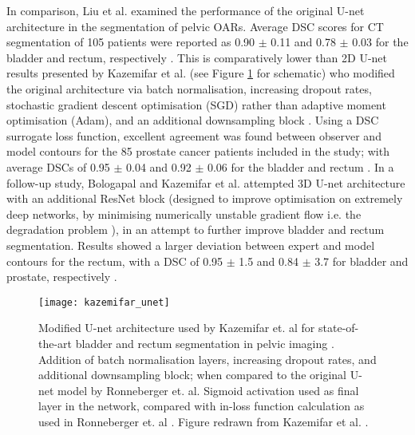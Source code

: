 In comparison, Liu et al. examined the performance of the original U-net architecture in the segmentation of pelvic OARs. Average DSC scores for CT segmentation of 105 patients were reported as 0.90 $\pm$ 0.11 and 0.78 $\pm$ 0.03 for the bladder and rectum, respectively \cite{Liu_2020}. This is comparatively lower than 2D U-net results presented by Kazemifar et al. (see Figure \ref{fig:kazemifar_unet} for schematic) who modified the original architecture via batch normalisation, increasing dropout rates, stochastic gradient descent optimisation (SGD) rather than adaptive moment optimisation (Adam), and an additional downsampling block \cite{Kazemifar_2018}. Using a DSC surrogate loss function, excellent agreement was found between observer and model contours for the 85 prostate cancer patients included in the study; with average DSCs of 0.95 $\pm$ 0.04 and 0.92 $\pm$ 0.06 for the bladder and rectum \cite{Kazemifar_2018}. In a follow-up study, Bologapal and Kazemifar et al. attempted 3D U-net architecture with an additional ResNet block (designed to improve optimisation on extremely deep networks, by minimising numerically unstable gradient flow \cite{Maier2019} i.e. the degradation problem \cite{He2015deep}), in an attempt to further improve bladder and rectum segmentation. Results showed a larger deviation between expert and model contours for the rectum, with a DSC of 0.95 $\pm$ 1.5 and 0.84 $\pm$ 3.7 for bladder and prostate, respectively \cite{Balagopal_2018}. 

\begin{figure}
	\begin{center}
		\texttt{[image: kazemifar\_unet]}
		\caption{Modified U-net architecture used by Kazemifar et. al for state-of-the-art bladder and rectum segmentation in pelvic imaging \cite{Kazemifar_2018}. Addition of batch normalisation layers, increasing dropout rates, and additional downsampling block; when compared to the original U-net model by Ronneberger et. al. Sigmoid activation used as final layer in the network, compared with in-loss function calculation as used in Ronneberger et. al \cite{Ronneberger_2015}. Figure redrawn from Kazemifar et al. \cite{Kazemifar_2018}.}
		\label{fig:kazemifar_unet}
	\end{center}
\end{figure}

